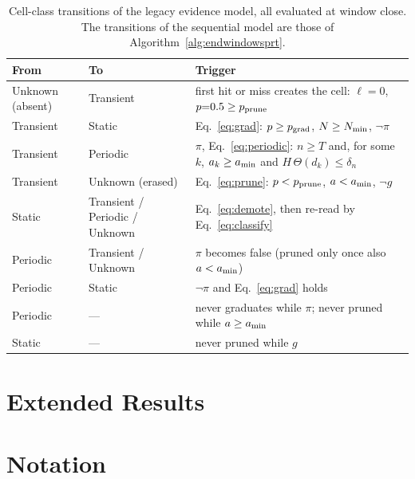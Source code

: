\begin{table}[H]
\centering
\caption{Cell-class transitions of the legacy evidence model, all evaluated at window close. The transitions of the sequential model are those of Algorithm~\ref{alg:endwindowsprt}.}
\label{tab:states}
\footnotesize
\begin{tabular}{@{}lll@{}}
\toprule
From & To & Trigger \\
\midrule
Unknown (absent) & Transient & first hit or miss creates the cell: $\ell{=}0$, $p{=}0.5\ge p_{\mathrm{prune}}$ \\
Transient & Static & Eq.~\eqref{eq:grad}: $p\ge p_{\mathrm{grad}}$, $N\ge N_{\min}$, $\lnot\pi$ \\
Transient & Periodic & $\pi$, Eq.~\eqref{eq:periodic}: $n\ge T$ and, for some $k$, $a_k\ge a_{\min}$ and $H\,\Theta(d_k)\le\delta_n$ \\
Transient & Unknown (erased) & Eq.~\eqref{eq:prune}: $p<p_{\mathrm{prune}}$, $a<a_{\min}$, $\lnot g$ \\
Static & Transient / Periodic / Unknown & Eq.~\eqref{eq:demote}, then re-read by Eq.~\eqref{eq:classify} \\
Periodic & Transient / Unknown & $\pi$ becomes false (pruned only once also $a<a_{\min}$) \\
Periodic & Static & $\lnot\pi$ and Eq.~\eqref{eq:grad} holds \\
Periodic & --- & never graduates while $\pi$; never pruned while $a\ge a_{\min}$ \\
Static & --- & never pruned while $g$ \\
\bottomrule
\end{tabular}
\end{table}

\section{Extended Results}\label{app:results}



\section{Notation}\label{app:notation}

